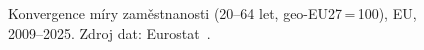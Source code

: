 \def\strStavZamestnanostTitle{Konvergence míry zaměstnanosti (20--64 let)}%
\def\strStavZamestnanostYlabel{míra zaměstnanosti (\acs{geo-EU27}\,=\,100) [\si{\percent}]}%
\def\strStavZamestnanostCaption{Konvergence míry zaměstnanosti (20--64 let, \acs{geo-EU27}\,=\,100), \acs{EU}, 2009--2025. Zdroj dat: Eurostat~\cite{eurostat_lfsi_emp_a}.}%
%

\providecommand\NudgeStavZamestnanostCz{5pt}%
\providecommand\NudgeStavZamestnanostAt{-14pt}%
\providecommand\NudgeStavZamestnanostDe{5pt}%
\providecommand\NudgeStavZamestnanostDk{4pt}%
\providecommand\NudgeStavZamestnanostPl{-1pt}%
\providecommand\NudgeStavZamestnanostSk{-8pt}%
\providecommand\NudgeStavZamestnanostEu{0pt}%
\begin{figure}[H]
  \centering
  
  \caption{\strStavZamestnanostCaption}
  \label{fig:stav_zamestnanost}
\end{figure}
